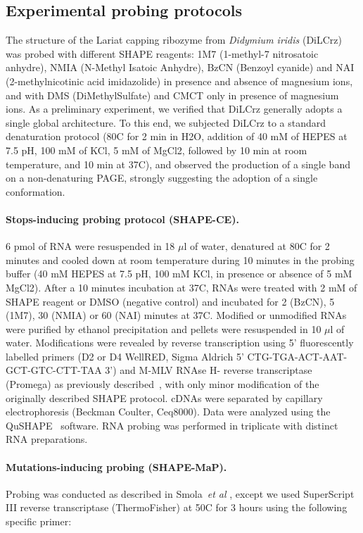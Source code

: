 \documentclass[a4,center,fleqn]{NAR}
\newcommand{\etal}{~\emph{et al} }
\begin{document}
\subsection{Experimental probing protocols}
The structure of the Lariat capping ribozyme from \textit{Didymium iridis }(DiLCrz) was probed with different SHAPE reagents: 1M7 (1-methyl-7 nitrosatoic anhydre), NMIA (N-Methyl Isatoic Anhydre), BzCN (Benzoyl cyanide) and NAI (2-methylnicotinic acid imidazolide) in presence and absence of magnesium ions, and with DMS (DiMethylSulfate) and CMCT only in presence of magnesium ions.
As a preliminary experiment, we verified that DiLCrz generally adopts a single global architecture. To this end, we subjected DiLCrz to a standard denaturation protocol (80\degree{}C for 2 min in H2O, addition of 40 mM of HEPES at 7.5 pH, 100 mM of KCl, 5 mM of MgCl2, followed by 10 min at room temperature, and 10 min at 37\degree{}C), and observed the production of a single band on a non-denaturing PAGE, strongly suggesting the adoption of a single conformation.

\paragraph{Stops-inducing probing protocol (SHAPE-CE).} 
6 pmol of RNA were resuspended in 18 $\mu$l of water, denatured at 80\degree{}C for 2 minutes and cooled down at room temperature during 10 minutes in the probing buffer (40 mM HEPES at 7.5 pH, 100 mM KCl, in presence or absence of 5 mM MgCl2). After a 10 minutes incubation at 37\degree{}C, RNAs were treated with 2 mM of SHAPE reagent or DMSO (negative control) and incubated for 2 (BzCN), 5 (1M7), 30 (NMIA) or 60 (NAI) minutes at 37\degree{}C. Modified or unmodified RNAs were purified by ethanol precipitation and pellets were resuspended in 10 $\mu$l of water.
Modifications were revealed by reverse transcription using 5’ fluorescently labelled primers (D2 or D4 WellRED, Sigma Aldrich 5’ CTG-TGA-ACT-AAT-GCT-GTC-CTT-TAA 3’) and M-MLV RNAse H- reverse transcriptase (Promega) as previously described~\cite{Deforges2017}, with only minor modification of the originally described SHAPE protocol\cite{Wilkinson2006}. cDNAs were separated by capillary electrophoresis (Beckman Coulter, Ceq8000). Data were analyzed using the  QuSHAPE~\cite{Karabiber2013} software. RNA probing was performed in triplicate with distinct RNA preparations.

\paragraph{Mutations-inducing probing (SHAPE-MaP).}
Probing was conducted as described in Smola\etal\cite{Smola2015}, except we used SuperScript III reverse transcriptase (ThermoFisher) at 50\degree{}C for 3 hours using the following specific primer: 
\end{document}
